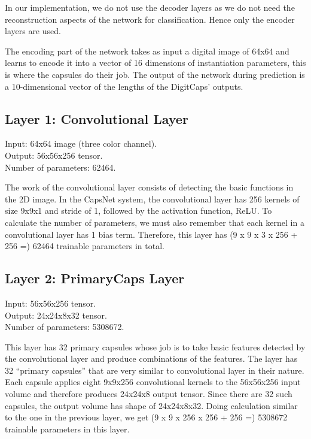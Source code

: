 In our implementation, we do not use the decoder layers as we do not need the reconstruction aspects of the network for classification. Hence only the encoder layers are used.
\par\bigskip
The encoding part of the network takes as input a digital image of 64x64 and learns to encode it into a vector of 16 dimensions of instantiation parameters, this is where the capsules do their job. The output of the network during prediction is a 10-dimensional vector of the lengths of the DigitCaps' outputs.


\subsection{Layer 1: Convolutional Layer} %
\label{sub:layer_1_convolutional_layer}
\noindent Input: 64x64 image (three color channel).
\\Output: 56x56x256 tensor.
\\Number of parameters: 62464.

\par\bigskip The work of the convolutional layer consists of detecting the basic functions in the 2D image. In the CapsNet system, the convolutional layer has 256 kernels of size 9x9x1 and stride of 1, followed by the activation function, ReLU. To calculate the number of parameters, we must also remember that each kernel in a convolutional layer has 1 bias term. Therefore, this layer has (9 x 9 x 3 x 256 + 256 =) 62464 trainable parameters in total.


\subsection{Layer 2: PrimaryCaps Layer} %
\label{sub:layer_2_primarycaps_layer}
\noindent Input: 56x56x256 tensor.
\\Output: 24x24x8x32 tensor.
\\Number of parameters: 5308672.

\par\bigskip This layer has 32 primary capsules whose job is to take basic features detected by the convolutional layer and produce combinations of the features. The layer has 32 “primary capsules” that are very similar to convolutional layer in their nature. Each capsule applies eight 9x9x256 convolutional kernels to the 56x56x256 input volume and therefore produces 24x24x8 output tensor. Since there are 32 such capsules, the output volume has shape of 24x24x8x32. Doing calculation similar to the one in the previous layer, we get (9 x 9 x 256 x 256 + 256 =) 5308672 trainable parameters in this layer.

